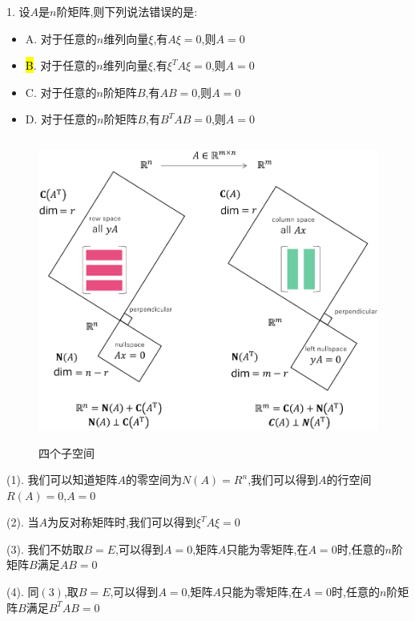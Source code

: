 1. 设$A$是$n$阶矩阵,则下列说法错误的是:  
\begin{itemize}
	\item A. 对于任意的$n$维列向量$\xi$,有$A\xi=0$,则$A=0$
	\item \hl{B}. 对于任意的$n$维列向量$\xi$,有$\xi^{T}A\xi=0$,则$A=0$
	\item C. 对于任意的$n$阶矩阵$B$,有$AB=0$,则$A=0$
	\item D. 对于任意的$n$阶矩阵$B$,有$B^{T}AB=0$,则$A=0$
\end{itemize}
\begin{figure}[ht]
	\centering
	\includegraphics[width=13cm,height=10cm]{"figure/Question/四个子空间.pdf"}
	\caption{四个子空间}
\end{figure} 
\begin{solution}

	(1). 我们可以知道矩阵$A$的零空间为$N(A)=R^{n}$,我们可以得到$A$的行空间$R(A)=0$,$A=0$
	
	(2). 当$A$为反对称矩阵时,我们可以得到$\xi^{T}A\xi=0$
	
	(3). 我们不妨取$B=E$,可以得到$A=0$,矩阵$A$只能为零矩阵,在$A=0$时,任意的$n$阶矩阵$B$满足$AB=0$
	
	(4). 同$(3)$,取$B=E$,可以得到$A=0$,矩阵$A$只能为零矩阵,在$A=0$时,任意的$n$阶矩阵$B$满足$B^{T}AB=0$
\end{solution}

